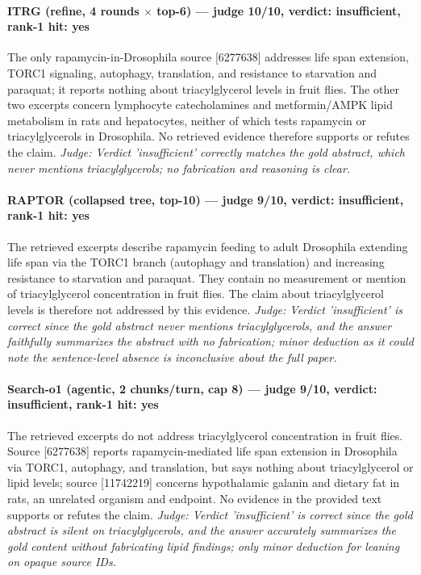 \documentclass[sigconf, review, anonymous]{acmart}
\begin{document}
\paragraph{ITRG (refine, 4 rounds $\times$ top-6) --- judge 10/10, verdict: insufficient, rank-1 hit: yes}
\noindent The only rapamycin-in-Drosophila source [6277638] addresses life span extension, TORC1 signaling, autophagy, translation, and resistance to starvation and paraquat; it reports nothing about triacylglycerol levels in fruit flies. The other two excerpts concern lymphocyte catecholamines and metformin/AMPK lipid metabolism in rats and hepatocytes, neither of which tests rapamycin or triacylglycerols in Drosophila. No retrieved evidence therefore supports or refutes the claim.
\noindent\small\textit{Judge: Verdict 'insufficient' correctly matches the gold abstract, which never mentions triacylglycerols; no fabrication and reasoning is clear.}
\paragraph{RAPTOR (collapsed tree, top-10) --- judge 9/10, verdict: insufficient, rank-1 hit: yes}
\noindent The retrieved excerpts describe rapamycin feeding to adult Drosophila extending life span via the TORC1 branch (autophagy and translation) and increasing resistance to starvation and paraquat. They contain no measurement or mention of triacylglycerol concentration in fruit flies. The claim about triacylglycerol levels is therefore not addressed by this evidence.
\noindent\small\textit{Judge: Verdict 'insufficient' is correct since the gold abstract never mentions triacylglycerols, and the answer faithfully summarizes the abstract with no fabrication; minor deduction as it could note the sentence-level absence is inconclusive about the full paper.}
\paragraph{Search-o1 (agentic, 2 chunks/turn, cap 8) --- judge 9/10, verdict: insufficient, rank-1 hit: yes}
\noindent The retrieved excerpts do not address triacylglycerol concentration in fruit flies. Source [6277638] reports rapamycin-mediated life span extension in Drosophila via TORC1, autophagy, and translation, but says nothing about triacylglycerol or lipid levels; source [11742219] concerns hypothalamic galanin and dietary fat in rats, an unrelated organism and endpoint. No evidence in the provided text supports or refutes the claim.
\noindent\small\textit{Judge: Verdict 'insufficient' is correct since the gold abstract is silent on triacylglycerols, and the answer accurately summarizes the gold content without fabricating lipid findings; only minor deduction for leaning on opaque source IDs.}
\end{document}

